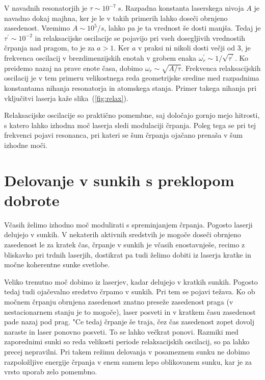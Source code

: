 V navadnih resonatorjih je $\tau \sim 10^{-7}~\si{s}$. Razpadna
konstanta laserskega nivoja $A$ je navadno dokaj majhna, ker je le v takih
primerih lahko doseči obrnjeno zasedenost. Vzemimo $A \sim 10^5/\si{s}$,
lahko pa je ta vrednost še dosti manjša. Tedaj je $\tau^{\prime}\sim 10^{-2}$ 
in relaksacijske oscilacije se pojavijo pri vseh dosegljivih vrednostih črpanja 
nad pragom, to je za $a>1$. Ker $a$ v praksi ni nikoli dosti večji od 3, 
je frekvenca oscilacij v brezdimenzijskih enotah v grobem
enaka $\omega^{\prime}_r\sim 1/\sqrt{\tau^{\prime}}$. Ko preidemo
nazaj na prave enote časa, dobimo $\omega_r\sim \sqrt{A/\tau}$. Frekvenca 
relaksacijskih oscilacij je v tem primeru velikostnega reda geometrijske 
sredine med razpadnima konstantama nihanja resonatorja in atomskega stanja. 
Primer takega nihanja pri vključitvi laserja kaže slika~(\ref{fig:relax}).

\begin{remark}
Relaksacijske oscilacije so praktično pomembne, saj določajo gornjo mejo
hitrosti, s katero lahko izhodna moč laserja sledi modulaciji črpanja.
Poleg tega se pri tej frekvenci pojavi resonanca, pri kateri se šum črpanja
ojačano prenaša v šum izhodne moči. 
\end{remark}


\section{Delovanje v sunkih s preklopom dobrote}
Včasih želimo
izhodno moč modulirati s spreminjanjem črpanja. Pogosto laserji delujejo v
sunkih. V nekaterih aktivnih sredstvih je mogoče doseči obrnjeno
zasedenost le za kratek čas, črpanje v sunkih je včasih enostavnješe,
recimo z bliskavko pri trdnih laserjih, dostikrat pa tudi želimo dobiti iz
laserja kratke in močne koherentne sunke svetlobe. 


Veliko trenutno moč dobimo iz laserjev, kadar delujejo v kratkih sunkih.
Pogosto tedaj tudi ojačevalno sredstvo črpamo v sunkih. Pri tem se
pojavi težava. Ko ob močnem črpanju obrnjena zasedenost znatno
preseže zasedenost praga (v nestacionarnem stanju je to mogoče), laser
posveti in v kratkem času zasedenost pade nazaj pod prag. "Ce tedaj
črpanje še traja, čez čas zasedenost zopet dovolj naraste in laser
ponovno posveti. To se lahko večkrat ponovi. Razmiki med zaporednimi sunki
so reda velikosti periode relaksacijskih oscilacij, so pa lahko precej
nepravilni. Pri takem režimu delovanja v posameznem sunku ne dobimo
razpoložljive energije črpanja v enem samem lepo oblikovanem sunku, kar
je za vrsto uporab zelo pomembno.

